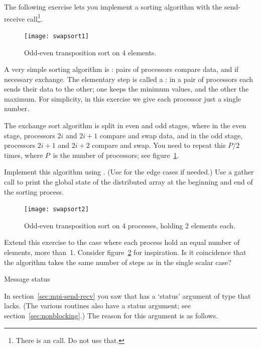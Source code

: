 The following exercise lets you implement a sorting algorithm with the
send-receive call\footnote {There is an 
  call. Do not use that.}.

\begin{figure}[ht]
  \texttt{[image: swapsort1]}
  \caption{Odd-even transposition sort on 4 elements.}
  \label{fig:swapsort1}
\end{figure}

\begin{exercise}
  \label{ex:exchangesort}
  A very simple sorting algorithm is :
  pairs of processors compare data, and if necessary exchange. The
  elementary step is called a : in a pair
  of processors each sends their data to the other; one keeps the
  minimum values, and the other the maximum.
  For simplicity, in this exercise we give each processor just a single number.

  The exchange sort algorithm is split in even and odd stages, where
  in the even stage, processors $2i$ and $2i+1$ compare and swap data,
  and in the odd stage, processors $2i+1$ and $2i+2$ compare and swap.
  You need to repeat this $P/2$ times, where $P$~is the number of
  processors; see figure~\ref{fig:swapsort1}.

  Implement this algorithm using . (Use
   for the edge cases if needed.)
  Use a gather call to print the global state of the distributed array
  at the beginning and end of the sorting process.
\end{exercise}

\begin{figure}[ht]
  \texttt{[image: swapsort2]}
  \caption{Odd-even transposition sort on 4 processes, holding 2
    elements each.}
  \label{fig:swapsort2}
\end{figure}

\begin{exercise}
  Extend this exercise to the case where each process hold an equal
  number of elements, more than~1. Consider figure~\ref{fig:swapsort2}
  for inspiration. Is it coincidence that the algorithm takes the same
  number of steps as in the single scalar case?
\end{exercise}

 {Message status}
\label{sec:mpi-status}

In section~\ref{sec:mpi-send-recv}
you saw that  has a `status' argument
of type  that  lacks.
(The various   routines also have a status
argument; see section~\ref{sec:nonblocking}.) The reason for this
argument is
as follows.

